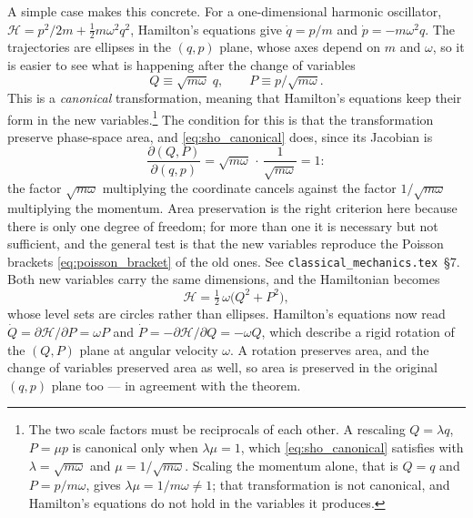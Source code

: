 \documentclass[12pt]{article}
\begin{document}
A simple case makes this concrete.  For a one-dimensional harmonic
oscillator, $\mathcal H = p^2/2m + \tfrac12 m\omega^2 q^2$, Hamilton's
equations give $\dot q = p/m$ and $\dot p = -m\omega^2 q$.  The
trajectories are ellipses in the $(q,p)$ plane, whose axes depend on
$m$ and $\omega$, so it is easier to see what is happening after the
change of variables
%
\begin{equation}
  Q \equiv \sqrt{m\omega}\;q,
  \qquad
  P \equiv p/\!\sqrt{m\omega}.
  \label{eq:sho_canonical}
\end{equation}
%
This is a \emph{canonical} transformation, meaning that Hamilton's
equations keep their form in the new variables.\footnote{The two scale
factors must be reciprocals of each other.  A rescaling
$Q = \lambda q$, $P = \mu p$ is canonical only when $\lambda\mu = 1$,
which \eqref{eq:sho_canonical} satisfies with
$\lambda = \sqrt{m\omega}$ and $\mu = 1/\!\sqrt{m\omega}$.  Scaling the
momentum alone, that is $Q = q$ and $P = p/m\omega$, gives
$\lambda\mu = 1/m\omega \neq 1$; that transformation is not canonical,
and Hamilton's equations do not hold in the variables it produces.}
The condition
for this is that the transformation preserve phase-space area, and
\eqref{eq:sho_canonical} does, since its Jacobian is
%
\begin{equation}
  \frac{\partial(Q,P)}{\partial(q,p)}
   = \sqrt{m\omega}\,\cdot\,\frac{1}{\sqrt{m\omega}} = 1 :
\end{equation}
%
the factor $\sqrt{m\omega}$ multiplying the coordinate cancels against
the factor $1/\!\sqrt{m\omega}$ multiplying the momentum.  Area
preservation is the right criterion here because there is only one
degree of freedom; for more than one it is necessary but not
sufficient, and the general test is that the new variables reproduce
the Poisson brackets \eqref{eq:poisson_bracket} of the old ones.  See
\texttt{classical\_mechanics.tex}~\S7.  Both new variables carry the
same dimensions,
and the Hamiltonian becomes
%
\begin{equation}
  \mathcal H = \tfrac12\,\omega\bigl(Q^2 + P^2\bigr),
\end{equation}
%
whose level sets are circles rather than ellipses.  Hamilton's
equations now read
$\dot Q = \partial\mathcal H/\partial P = \omega P$ and
$\dot P = -\partial\mathcal H/\partial Q = -\omega Q$, which describe a
rigid rotation of the $(Q,P)$ plane at angular velocity $\omega$.  A
rotation preserves area, and the change of variables preserved area as
well, so area is preserved in the original $(q,p)$ plane too --- in
agreement with the theorem.
\end{document}
